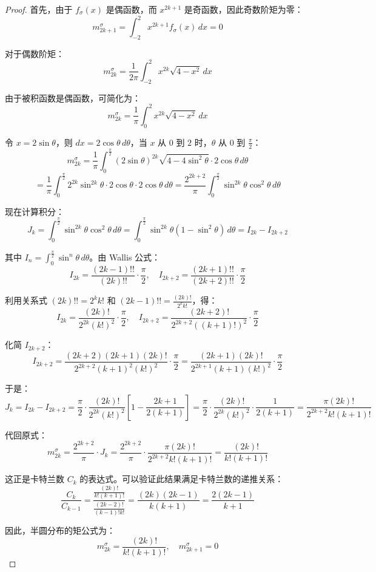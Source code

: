 \begin{proof}
    首先，由于 $f_\sigma(x)$ 是偶函数，而 $x^{2k+1}$ 是奇函数，因此奇数阶矩为零：
\[
m_{2k+1}^\sigma = \int_{-2}^{2} x^{2k+1} f_\sigma(x) \, dx = 0
\]

对于偶数阶矩：
\[
m_{2k}^\sigma = \frac{1}{2\pi} \int_{-2}^{2} x^{2k} \sqrt{4 - x^2} \, dx
\]

由于被积函数是偶函数，可简化为：
\[
m_{2k}^\sigma = \frac{1}{\pi} \int_{0}^{2} x^{2k} \sqrt{4 - x^2} \, dx
\]

令 $x = 2\sin\theta$，则 $dx = 2\cos\theta \, d\theta$，当 $x$ 从 $0$ 到 $2$ 时，$\theta$ 从 $0$ 到 $\frac{\pi}{2}$：
\[
m_{2k}^\sigma = \frac{1}{\pi} \int_{0}^{\frac{\pi}{2}} (2\sin\theta)^{2k} \sqrt{4 - 4\sin^2\theta} \cdot 2\cos\theta \, d\theta
\]
\[
= \frac{1}{\pi} \int_{0}^{\frac{\pi}{2}} 2^{2k} \sin^{2k}\theta \cdot 2\cos\theta \cdot 2\cos\theta \, d\theta
= \frac{2^{2k+2}}{\pi} \int_{0}^{\frac{\pi}{2}} \sin^{2k}\theta \cos^2\theta \, d\theta
\]

现在计算积分：
\[
J_k = \int_{0}^{\frac{\pi}{2}} \sin^{2k}\theta \cos^2\theta \, d\theta
= \int_{0}^{\frac{\pi}{2}} \sin^{2k}\theta (1 - \sin^2\theta) \, d\theta
= I_{2k} - I_{2k+2}
\]

其中 $I_n = \int_{0}^{\frac{\pi}{2}} \sin^n\theta \, d\theta$。由 Wallis 公式：
\[
I_{2k} = \frac{(2k-1)!!}{(2k)!!} \cdot \frac{\pi}{2}, \quad
I_{2k+2} = \frac{(2k+1)!!}{(2k+2)!!} \cdot \frac{\pi}{2}
\]

利用关系式 $(2k)!! = 2^k k!$ 和 $(2k-1)!! = \frac{(2k)!}{2^k k!}$，得：
\[
I_{2k} = \frac{(2k)!}{2^{2k} (k!)^2} \cdot \frac{\pi}{2}, \quad
I_{2k+2} = \frac{(2k+2)!}{2^{2k+2} ((k+1)!)^2} \cdot \frac{\pi}{2}
\]

化简 $I_{2k+2}$：
\[
I_{2k+2} = \frac{(2k+2)(2k+1)(2k)!}{2^{2k+2} (k+1)^2 (k!)^2} \cdot \frac{\pi}{2}
= \frac{(2k+1)(2k)!}{2^{2k+1} (k+1)(k!)^2} \cdot \frac{\pi}{2}
\]

于是：
\[
J_k = I_{2k} - I_{2k+2} = \frac{\pi}{2} \cdot \frac{(2k)!}{2^{2k} (k!)^2} \left[ 1 - \frac{2k+1}{2(k+1)} \right]
= \frac{\pi}{2} \cdot \frac{(2k)!}{2^{2k} (k!)^2} \cdot \frac{1}{2(k+1)}
= \frac{\pi (2k)!}{2^{2k+2} k!(k+1)!}
\]

代回原式：
\[
m_{2k}^\sigma = \frac{2^{2k+2}}{\pi} \cdot J_k
= \frac{2^{2k+2}}{\pi} \cdot \frac{\pi (2k)!}{2^{2k+2} k!(k+1)!}
= \frac{(2k)!}{k!(k+1)!}
\]

这正是卡特兰数 $C_k$ 的表达式。可以验证此结果满足卡特兰数的递推关系：
\[
\frac{C_k}{C_{k-1}} = \frac{\frac{(2k)!}{k!(k+1)!}}{\frac{(2k-2)!}{(k-1)!k!}}
= \frac{(2k)(2k-1)}{k(k+1)} = \frac{2(2k-1)}{k+1}
\]

因此，半圆分布的矩公式为：
\[
m_{2k}^\sigma = \frac{(2k)!}{k!(k+1)!}, \quad m_{2k+1}^\sigma = 0
\]
\end{proof}
